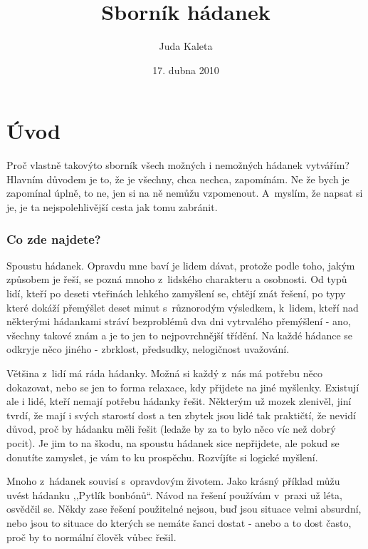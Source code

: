 \documentclass[czech]{book}
\begin{document}
\title{Sborník hádanek}
\author{Juda Kaleta}
\date{17. dubna 2010}

\maketitle

\tableofcontents{}


\chapter{Úvod}

Proč vlastně takovýto sborník všech možných i nemožných hádanek vytvářím?
Hlavním důvodem je to, že je všechny, chca nechca, zapomínám. Ne že
bych je zapomínal úplně, to ne, jen si na ně nemůžu vzpomenout.
A~myslím, že napsat si je, je ta nejspolehlivější cesta jak tomu zabránit.


\subsection{Co zde najdete?}

Spoustu hádanek. Opravdu mne baví je lidem dávat, protože podle toho,
jakým způsobem je řeší, se pozná mnoho z~lidského charakteru a osobnosti.
Od typů lidí, kteří po deseti vteřinách lehkého zamyšlení se, chtějí
znát řešení, po typy které dokáží přemýšlet deset minut s~různorodým
výsledkem, k~lidem, kteří nad některými hádankami stráví bezproblémů
dva dni vytrvalého přemýšlení - ano, všechny takové znám a je to jen
to nejpovrchnější třídění. Na každé hádance se odkryje něco jiného
- zbrklost, předsudky, nelogičnost uvažování.

Většina z~lidí má ráda hádanky. Možná si každý z~nás má potřebu něco
dokazovat, nebo se jen to forma relaxace, kdy přijdete na jiné myšlenky.
Existují ale i lidé, kteří nemají potřebu hádanky řešit. Některým
už mozek zlenivěl, jiní tvrdí, že mají i svých starostí dost a ten
zbytek jsou lidé tak praktičtí, že nevidí důvod, proč by hádanku měli
řešit (ledaže by za to bylo něco víc než dobrý pocit). Je jim to na
škodu, na spoustu hádanek sice nepřijdete, ale pokud se donutíte zamyslet,
je vám to ku prospěchu. Rozvíjíte si logické myšlení.

Mnoho z~hádanek souvisí s~opravdovým životem. Jako krásný příklad
můžu uvést hádanku ,,Pytlík bonbónů{}``. Návod na řešení používám
v~praxi už léta, osvědčil se. Někdy zase řešení použitelné nejsou,
buď jsou situace velmi absurdní, nebo jsou to situace do kterých se
nemáte šanci dostat - anebo a to dost často, proč by to normální člověk
vůbec řešil.
\end{document}
